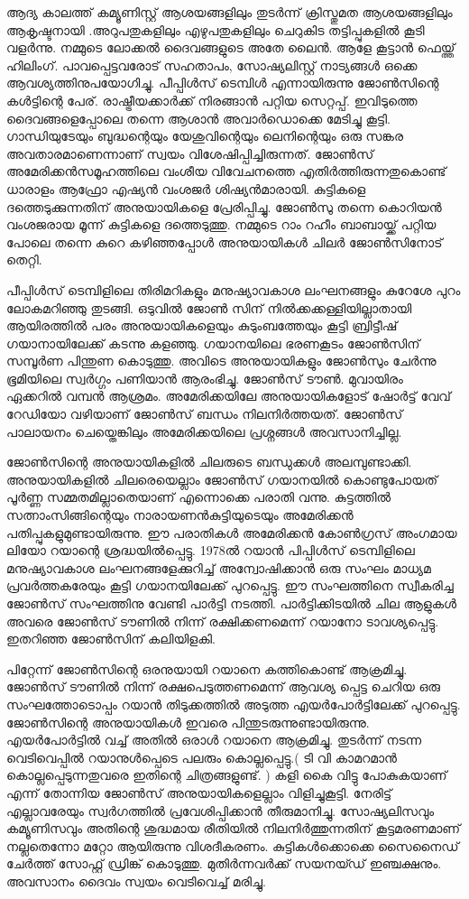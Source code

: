 \documentclass[10pt,a4paper]{report}
\begin{document}
  ആദ്യ കാലത്ത് കമ്യൂണിസ്റ്റ് ആശയങ്ങളിലും തുടർന്ന് ക്രിസ്തുമത ആശയങ്ങളിലും ആകൃഷ്ടനായി .അറുപതുകളിലും എഴുപതുകളിലും ചെറുകിട തട്ടിപ്പുകളിൽ കൂടി വളർന്നു. നമ്മുടെ ലോക്കൽ ദൈവങ്ങളുടെ അതേ ലൈൻ. ആളേ കൂട്ടാൻ ഫെയ്ത്ത് ഹിലിംഗ്. പാവപ്പെട്ടവരോട് സഹതാപം, സോഷ്യലിസ്റ്റ് നാട്യങ്ങൾ ഒക്കെ ആവശ്യത്തിനുപയോഗിച്ചു. പീപ്പിൾസ് ടെമ്പിൾ എന്നായിരുന്നു ജോൺസിന്റെ കൾട്ടിന്റെ പേര്. രാഷ്ട്രീയക്കാർക്ക് നിരങ്ങാൻ പറ്റിയ സെറ്റപ്പ്. ഇവിടുത്തെ ദൈവങ്ങളെപ്പോലെ തന്നെ ആശാൻ അവാർഡൊക്കെ മേടിച്ചു കൂട്ടി. ഗാന്ധിയുടേയും ബുദ്ധന്റെയും യേശുവിന്റെയും ലെനിന്റെയും ഒരു സങ്കര അവതാരമാണെന്നാണ് സ്വയം വിശേഷിപ്പിച്ചിരുന്നത്. ജോൺസ് അമേരിക്കൻസമൂഹത്തിലെ വംശീയ വിവേചനത്തെ എതിർത്തിരുന്നതുകൊണ്ട് ധാരാളം ആഫ്രോ എഷ്യൻ വംശജർ ശിഷ്യൻമാരായി. കുട്ടികളെ ദത്തെടുക്കുന്നതിന് അനുയായികളെ പ്രേരിപ്പിച്ചു. ജോൺസു തന്നെ കൊറിയൻ വംശജരായ മൂന്ന് കുട്ടികളെ ദത്തെടുത്തു. നമ്മുടെ  റാം റഹീം ബാബായ്ക്ക് പറ്റിയ പോലെ തന്നെ കുറെ കഴിഞ്ഞപ്പോൾ അനുയായികൾ ചിലർ ജോൺസിനോട് തെറ്റി. 
  
  പീപ്പിൾസ് ടെമ്പിളിലെ തിരിമറികളും മനുഷ്യാവകാശ ലംഘനങ്ങളും കുറേശേ പുറം ലോകമറിഞ്ഞു തുടങ്ങി. ഒടുവിൽ ജോൺ സിന് നിൽക്കക്കള്ളിയില്ലാതായി ആയിരത്തിൽ പരം അനുയായികളെയും കുടുംബത്തേയും കൂട്ടി ബ്രിട്ടീഷ് ഗയാനായിലേക്ക് കടന്നു കളഞ്ഞു. ഗയാനയിലെ ഭരണകൂടം ജോൺസിന് സമ്പൂർണ പിന്തുണ കൊടുത്തു. അവിടെ അനുയായികളും ജോൺസും ചേർന്നു ഭൂമിയിലെ സ്വർഗ്ഗം പണിയാൻ ആരംഭിച്ചു. ജോൺസ് ടൗൺ. മുവായിരം ഏക്കറിൽ വമ്പൻ ആശ്രമം. അമേരിക്കയിലേ അനുയായികളോട് ഷോർട്ട് വേവ് റേഡിയോ വഴിയാണ് ജോൺസ് ബന്ധം നിലനിർത്തയത്. ജോൺസ് പാലായനം ചെയ്തെങ്കിലും അമേരിക്കയിലെ പ്രശ്നങ്ങൾ അവസാനിച്ചില്ല.
  
   ജോൺസിന്റെ അനുയായികളിൽ ചിലരുടെ ബന്ധുക്കൾ അലമ്പുണ്ടാക്കി. അനുയായികളിൽ ചിലരെയെല്ലാം ജോൺസ് ഗയാനയിൽ കൊണ്ടുപോയത് പൂർണ്ണ സമ്മതമില്ലാതെയാണ് എന്നൊക്കെ പരാതി വന്നു. കുട്ടത്തിൽ സത്നാംസിങ്ങിന്റെയും നാരായണൻകുട്ടിയുടെയും അമേരിക്കൻ പതിപ്പുകളുമുണ്ടായിരുന്നു. ഈ പരാതികൾ അമേരിക്കൻ കോൺഗ്രസ് അംഗമായ ലിയോ റയാന്റെ ശ്രദ്ധയിൽപ്പെട്ടു. 1978ൽ റയാൻ പിപ്പിൾസ് ടെമ്പിളിലെ മനുഷ്യാവകാശ ലംഘനങ്ങളേക്കുറിച്ച് അന്വോഷിക്കാൻ ഒരു സംഘം മാധ്യമ പ്രവർത്തകരേയും കൂട്ടി ഗയാനയിലേക്ക് പുറപ്പെട്ടു. ഈ സംഘത്തിനെ സ്വീകരിച്ച ജോൺസ് സംഘത്തിനു വേണ്ടി പാർട്ടി നടത്തി. പാർട്ടിക്കിടയിൽ ചില ആളുകൾ അവരെ ജോൺസ് ടൗണിൽ നിന്ന് രക്ഷിക്കണമെന്ന് റയാനോ ടാവശ്യപ്പെട്ടു. ഇതറിഞ്ഞ ജോൺസിന് കലിയിളകി. 
   
   പിറ്റേന്ന് ജോൺസിന്റെ ഒരനുയായി റയാനെ കത്തികൊണ്ട് ആക്രമിച്ചു. ജോൺസ് ടൗണിൽ നിന്ന് രക്ഷപെടുത്തണമെന്ന് ആവശ്യ പ്പെട്ട ചെറിയ ഒരു സംഘത്തോടൊപ്പം റയാൻ തിടുക്കത്തിൽ അടുത്ത എയർപോർട്ടിലേക്ക് പുറപ്പെട്ടു. ജോൺസിന്റെ അനുയായികൾ ഇവരെ പിന്തുടരുന്നുണ്ടായിരുന്നു. എയർപോർട്ടിൽ വച്ച് അതിൽ ഒരാൾ റയാനെ ആക്രമിച്ചു. തുടർന്ന് നടന്ന വെടിവെപ്പിൽ റയാനുൾപ്പെടെ പലരും കൊല്ലപ്പെട്ടു.( ടി വി കാമറമാൻ കൊല്ലപ്പെടുന്നതുവരെ ഇതിന്റെ ചിത്രങ്ങളുണ്ട്. ) കളി കൈ വിട്ടു പോകുകയാണ് എന്ന് തോന്നിയ ജോൺസ് അനുയായികളെല്ലാം വിളിച്ചുകൂട്ടി. നേരിട്ട് എല്ലാവരേയും സ്വർഗത്തിൽ പ്രവേശിപ്പിക്കാൻ തീരുമാനിച്ചു. സോഷ്യലിസവും കമ്യൂണിസവും അതിന്റെ ശുദ്ധമായ രീതിയിൽ നിലനിർത്തുന്നതിന് കൂട്ടമരണമാണ് നല്ലതെന്നോ മറ്റോ ആയിരുന്നു വിശദീകരണം. കുട്ടികൾക്കൊക്കെ സൈനൈഡ് ചേർത്ത് സോഫ്റ്റ് ഡ്രിങ്ക് കൊടുത്തു. മുതിർന്നവർക്ക് സയനയ്ഡ് ഇഞ്ചക്ഷനും. അവസാനം ദൈവം സ്വയം വെടിവെച്ച് മരിച്ചു. 
   
\end{document}

